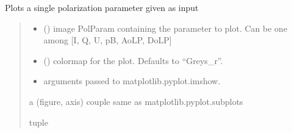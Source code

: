 \documentclass[letterpaper,10pt,english]{sphinxmanual}
\begin{document}
\begin{fulllineitems}
\begin{fulllineitems}
\label{\detokenize{micropolarray:micropolarray.micropol_image.MicropolImage.show_pol_param}}
\pysigstartsignatures
{}
\pysigstopsignatures
\sphinxAtStartPar
Plots a single polarization parameter given as input
\begin{quote}\begin{description}
\begin{itemize}
\item {} 
\sphinxAtStartPar
{} () \textendash{} image PolParam containing the parameter to plot. Can be one among {[}I, Q, U, pB, AoLP, DoLP{]}

\item {} 
\sphinxAtStartPar
{} (\sphinxstyleliteralemphasis{\sphinxupquote{, }}) \textendash{} colormap for the plot. Defaults to “Greys\_r”.

\item {} 
\sphinxAtStartPar
{} \textendash{} arguments passed to matplotlib.pyplot.imshow.

\end{itemize}

\sphinxAtStartPar
a (figure, axis) couple same as matplotlib.pyplot.subplots

\sphinxAtStartPar
tuple

\end{description}\end{quote}

\end{fulllineitems}



\end{fulllineitems}
\end{document}
